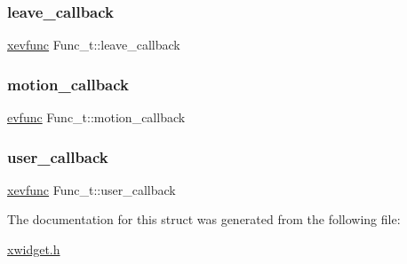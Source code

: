 \mbox{\label{structFunc__t_a1801ba902bd7efc706d474312f960d0a}} 
\subsubsection{\texorpdfstring{leave\+\_\+callback}{leave\_callback}}
{\footnotesize\ttfamily \hyperlink{xwidget_8h_a9ef0263424a7f5f8f6b02055fca67ddd}{xevfunc} Func\+\_\+t\+::leave\+\_\+callback}

\mbox{\label{structFunc__t_ac2842c834907f4aeace8f404c6cc7621}} 
\subsubsection{\texorpdfstring{motion\+\_\+callback}{motion\_callback}}
{\footnotesize\ttfamily \hyperlink{xwidget_8h_ab4ae973f86a383c8c0f92b709044520a}{evfunc} Func\+\_\+t\+::motion\+\_\+callback}

\mbox{\label{structFunc__t_a1f089cb13a39764a1f980470a51db71b}} 
\subsubsection{\texorpdfstring{user\+\_\+callback}{user\_callback}}
{\footnotesize\ttfamily \hyperlink{xwidget_8h_a9ef0263424a7f5f8f6b02055fca67ddd}{xevfunc} Func\+\_\+t\+::user\+\_\+callback}



The documentation for this struct was generated from the following file\+:\begin{DoxyCompactItemize}
\item 
\hyperlink{xwidget_8h}{xwidget.\+h}\end{DoxyCompactItemize}

